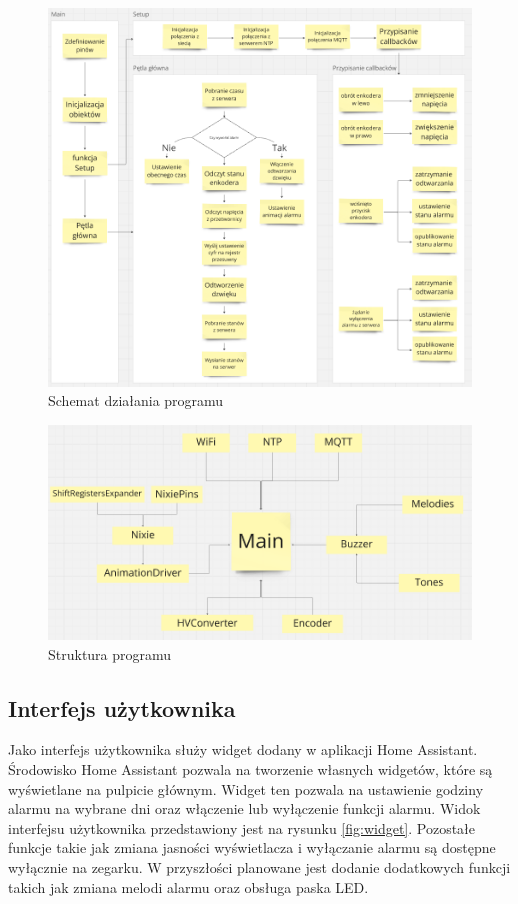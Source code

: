 \documentclass[../main.tex]{subfiles}
\begin{document}
\begin{figure}[H]
    \centering
    \includegraphics[width=1\textwidth]{program.png}
    \caption{Schemat działania programu}
    \label{fig:schemat_dzialania}
\end{figure}

\begin{figure}[H]
    \centering
    \includegraphics[width=1\textwidth]{Struktura.png}
    \caption{Struktura programu}
    \label{fig:struktura_programu}
\end{figure}

\subsection{Interfejs użytkownika}
Jako interfejs użytkownika służy widget dodany w aplikacji Home Assistant. Środowisko Home Assistant pozwala na tworzenie własnych widgetów,
które są wyświetlane na pulpicie głównym. Widget ten pozwala na ustawienie godziny alarmu na wybrane dni oraz włączenie lub wyłączenie funkcji alarmu.
Widok interfejsu użytkownika przedstawiony jest na rysunku \ref{fig:widget}. Pozostałe funkcje takie jak zmiana jasności wyświetlacza i wyłączanie
alarmu są dostępne wyłącznie na zegarku. W przyszłości planowane jest dodanie dodatkowych funkcji takich jak zmiana melodi alarmu oraz obsługa
paska LED. 
\end{document}
